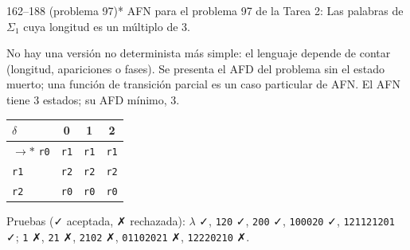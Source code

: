 \documentclass[11pt]{article}
\begin{document}
\begin{ejercicio}{162--188 (problema 97)}{*}
AFN para el problema 97 de la Tarea 2: Las palabras de $\Sigma_1$ cuya longitud es un múltiplo de 3.
\end{ejercicio}
\proc No hay una versión no determinista más simple: el lenguaje depende de contar (longitud, apariciones o fases). Se presenta el AFD del problema sin el estado muerto; una función de transición parcial es un caso particular de AFN. El AFN tiene 3 estados; su AFD mínimo, 3.
\begin{center}\small\begin{tabular}{lccc}\toprule
$\delta$ & 0 & 1 & 2 \\\midrule
$\to$$*$ \texttt{r0} & \texttt{r1} & \texttt{r1} & \texttt{r1} \\
 \texttt{r1} & \texttt{r2} & \texttt{r2} & \texttt{r2} \\
 \texttt{r2} & \texttt{r0} & \texttt{r0} & \texttt{r0} \\
\bottomrule\end{tabular}\end{center}
Pruebas (✓ aceptada, ✗ rechazada): $\lambda$ ✓, \texttt{120} ✓, \texttt{200} ✓, \texttt{100020} ✓, \texttt{121121201} ✓; \texttt{1} ✗, \texttt{21} ✗, \texttt{2102} ✗, \texttt{01102021} ✗, \texttt{12220210} ✗.
\end{document}
